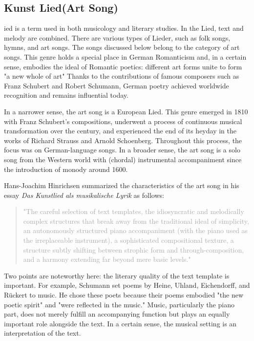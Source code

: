 \documentclass[10pt,a4paper,onecolumn]{rho}
\begin{document}
\subsection{Kunst Lied(Art Song)}
 ied is a term used in both musicology and literary studies. In the Lied, text and melody are combined. There are various types of Lieder, such as folk songs, hymns, and art songs. The songs discussed below belong to the category of art songs. This genre holds a special place in German Romanticism and, in a certain sense, embodies the ideal of Romantic poetics: different art forms unite to form "a new whole of art" Thanks to the contributions of famous composers such as Franz Schubert and Robert Schumann, German poetry achieved worldwide recognition and remains influential today.

In a narrower sense, the art song is a European Lied. This genre emerged in 1810 with Franz Schubert's compositions, underwent a process of continuous musical transformation over the century, and experienced the end of its heyday in the works of Richard Strauss and Arnold Schoenberg. Throughout this process, the focus was on German-language songs. In a broader sense, the art song is a solo song from the Western world with (chordal) instrumental accompaniment since the introduction of monody around 1600. 

Hans-Joachim Hinrichsen summarized the characteristics of the art song in his essay \textit{Das Kunstlied als musikalische Lyrik} as follows:
\begin{quote}
    \textcolor{darkgray}{"The careful selection of text templates, the idiosyncratic and melodically complex structures that break away from the traditional ideal of simplicity, an autonomously structured piano accompaniment (with the piano used as the irreplaceable instrument), a sophisticated compositional texture, a structure subtly shifting between strophic form and through-composition, and a harmony extending far beyond mere basic levels."}
\end{quote}

Two points are noteworthy here: the literary quality of the text template is important. For example, Schumann set poems by Heine, Uhland, Eichendorff, and Rückert to music. He chose these poets because their poems embodied "the new poetic spirit" and "were reflected in the music." Music, particularly the piano part, does not merely fulfill an accompanying function but plays an equally important role alongside the text. In a certain sense, the musical setting is an interpretation of the text.
\end{document}

